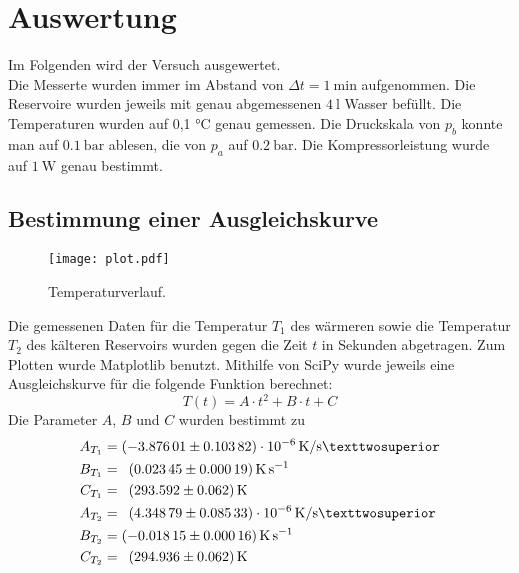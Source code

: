 \section{Auswertung}
\label{sec:Auswertung}
Im Folgenden wird der Versuch ausgewertet.\\
Die Messerte wurden immer im Abstand von $\Delta t = \SI{1}{\minute}$ aufgenommen.
Die Reservoire wurden jeweils mit genau abgemessenen $\SI{4}{\litre}$ Wasser befüllt.
Die Temperaturen wurden auf 0,1 $ \si{\celsius} $ genau gemessen.
Die Druckskala von $ p_b $ konnte man auf $ \SI{0,1}{\bar} $ ablesen, die von $ p_a $ auf $ \SI{0,2}{\bar} $.
Die Kompressorleistung wurde auf $ \SI{1}{\watt} $ genau bestimmt.
\subsection{Bestimmung einer Ausgleichskurve}
\begin{figure}[H]
  \centering
  \texttt{[image: plot.pdf]}
  \caption{Temperaturverlauf.}
  \label{fig:plot}
\end{figure}
Die gemessenen Daten für die Temperatur $T_1$ des wärmeren sowie die Temperatur
$T_2$ des kälteren Reservoirs wurden gegen die Zeit $t$ in Sekunden abgetragen.
Zum Plotten wurde Matplotlib \cite{matplotlib} benutzt.
Mithilfe von SciPy \cite{scipy} wurde jeweils eine Ausgleichskurve für die folgende Funktion
berechnet:
\begin{equation}
  T(t)=A \cdot t^2 + B \cdot t + C
\end{equation}
Die Parameter $A$, $B$ und $C$ wurden bestimmt zu
\begin{align*}
A_{T_1} &= \SI{-3.87601 +- 0.10382e-6}{\kelvin\per\second²} \\
B_{T_1} &= \phantom{1}\SI{0.02345 +- 0.00019}{\kelvin\per\second} \\
C_{T_1} &= \phantom{1}\SI{293.592 +- 0.062}{\kelvin} \\
A_{T_2} &= \phantom{1}\SI{4.34879 +- 0.08533e-6}{\kelvin\per\second²}  \\
 B_{T_2} &= \SI{-0.01815 +- 0.00016}{\kelvin\per\second} \\
  C_{T_2} &= \phantom{1}\SI{294.936 +- 0.062}{\kelvin}
\end{align*}

